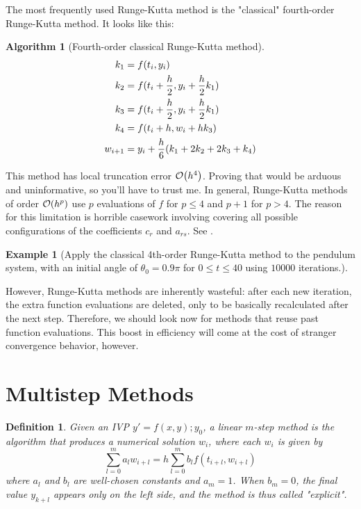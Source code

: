 \documentclass{article}
\newtheorem{definition}{Definition}[section]
\newtheorem{example}{Example}[section]
\newtheorem{algorithm}{Algorithm}[section]
\newcommand{\0}{\vb{0}}
\begin{document}
The most frequently used Runge-Kutta method is the "classical" fourth-order Runge-Kutta method. It looks like this:
\begin{algorithm}[Fourth-order classical Runge-Kutta method]
  \label{runge4}
  \begin{align*}
    k_1 & = f(t_i, y_i) \\
    k_2 & = f(t_i + \frac{h}{2}, y_i + \frac{h}{2}k_1) \\
    k_3 & = f(t_i + \frac{h}{2}, y_i + \frac{h}{2}k_1) \\
    k_4 & = f(t_i + h, w_i + hk_3) \\
    w_{i+1} & = y_i + \frac{h}{6}\qty(k_1 + 2k_2 + 2k_3 + k_4)
  \end{align*}
\end{algorithm}
This method has local truncation error $\order{h^4}$. Proving that would be arduous and uninformative, so you'll have to trust me. In general, Runge-Kutta methods of order $\order{h^p}$ use $p$ evaluations of $f$ for $p \leq 4$ and $p+1$ for $p > 4$. The reason for this limitation is horrible casework involving covering all possible configurations of the coefficients $c_r$ and $a_{rs}$. See \cite{butcher1964}.

\begin{example}[Apply the classical 4th-order Runge-Kutta method to the pendulum system, with an initial angle of $\theta_0 = 0.9\pi$ for $0 \leq t \leq 40$ using $10000$ iterations.]
\end{example}

However, Runge-Kutta methods are inherently wasteful: after each new iteration, the extra function evaluations are deleted, only to be basically recalculated after the next step. Therefore, we should look now for methods that reuse past function evaluations. This boost in efficiency will come at the cost of stranger convergence behavior, however.


\section{Multistep Methods}

\begin{definition}
  Given an IVP $y' = f(x, y); y_0$, a linear $m$-step method is the algorithm that produces a numerical solution $w_i$, where each $w_i$ is given by
  \[\sum_{l=0}^ma_lw_{i+l} = h\sum_{l=0}^mb_lf(t_{i+l}, w_{i+l})\]
  where $a_l$ and $b_l$ are well-chosen constants and $a_m = 1$. When $b_m = 0$, the final value $y_{k+l}$ appears only on the left side, and the method is thus called "\emph{explicit}".
\end{definition}
\end{document}
